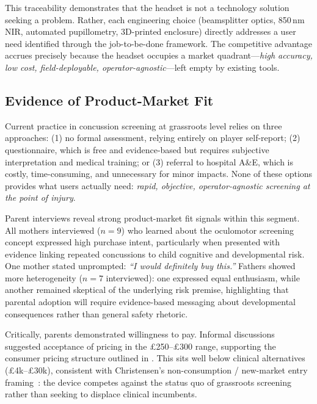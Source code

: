 This traceability demonstrates that the headset is not a technology solution seeking a problem. Rather, each engineering choice (beamsplitter optics, 850\,nm NIR, automated pupillometry, 3D-printed enclosure) directly addresses a user need identified through the job-to-be-done framework. The competitive advantage accrues precisely because the headset occupies a market quadrant---\textit{high accuracy, low cost, field-deployable, operator-agnostic}---left empty by existing tools.


\subsection{Evidence of Product-Market Fit}
\label{sec:ent-pmf-evidence}

Current practice in concussion screening at grassroots level relies on three approaches: (1) no formal assessment, relying entirely on player self-report; (2)  questionnaire, which is free and evidence-based but requires subjective interpretation and medical training; or (3) referral to hospital A\&E, which is costly, time-consuming, and unnecessary for minor impacts. None of these options provides what users actually need: \textit{rapid, objective, operator-agnostic screening at the point of injury}.

Parent interviews reveal strong product-market fit signals within this segment. All mothers interviewed ($n = 9$) who learned about the oculomotor screening concept expressed high purchase intent, particularly when presented with evidence linking repeated concussions to child cognitive and developmental risk. One mother stated unprompted: \textit{``I would definitely buy this.''} Fathers showed more heterogeneity ($n = 7$ interviewed): one expressed equal enthusiasm, while another remained skeptical of the underlying risk premise, highlighting that parental adoption will require evidence-based messaging about developmental consequences rather than general safety rhetoric.

Critically, parents demonstrated willingness to pay. Informal discussions suggested acceptance of pricing in the \pounds 250--\pounds 300 range, supporting the consumer pricing structure outlined in . This sits well below clinical alternatives (\pounds 4k--\pounds 30k), consistent with Christensen's non-consumption / new-market entry framing~\cite{christensen2003innovatorssolution}: the device competes against the status quo of grassroots screening rather than seeking to displace clinical incumbents.

